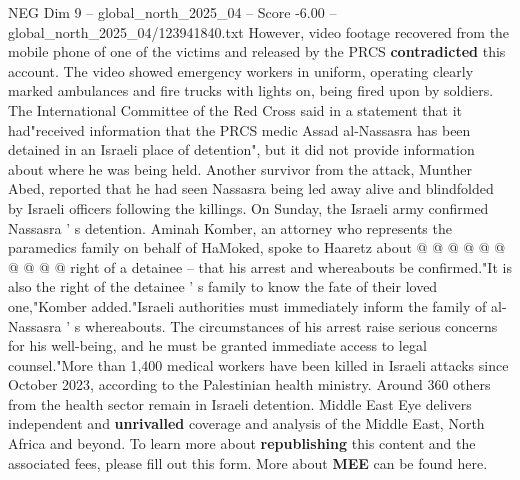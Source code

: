 \begin{textsample}{NEG Dim 9 – global\_north\_2025\_04 – Score -6.00 – global\_north\_2025\_04/123941840.txt}
However, video footage recovered from the mobile phone of one of the victims and released by the PRCS \textbf{contradicted} this account.
The video showed emergency workers in uniform, operating clearly marked ambulances and fire trucks with lights on, being fired upon by soldiers.
The International Committee of the Red Cross said in a statement that it had"received information that the PRCS medic Assad al-Nassasra has been detained in an Israeli place of detention", but it did not provide information about where he was being held.
Another survivor from the attack, Munther Abed, reported that he had seen Nassasra being led away alive and blindfolded by Israeli officers following the killings.
On Sunday, the Israeli army confirmed Nassasra ' s detention.
Aminah Komber, an attorney who represents the paramedics family on behalf of HaMoked, spoke to Haaretz about @ @ @ @ @ @ @ @ @ @ right of a detainee -- that his arrest and whereabouts be confirmed."It is also the right of the detainee ' s family to know the fate of their loved one,"Komber added."Israeli authorities must immediately inform the family of al-Nassasra ' s whereabouts.
The circumstances of his arrest raise serious concerns for his well-being, and he must be granted immediate access to legal counsel."More than 1,400 medical workers have been killed in Israeli attacks since October 2023, according to the Palestinian health ministry.
Around 360 others from the health sector remain in Israeli detention.
Middle East Eye delivers independent and \textbf{unrivalled} coverage and analysis of the Middle East, North Africa and beyond.
To learn more about \textbf{republishing} this content and the associated fees, please fill out this form.
More about \textbf{MEE} can be found here.

\end{textsample}
